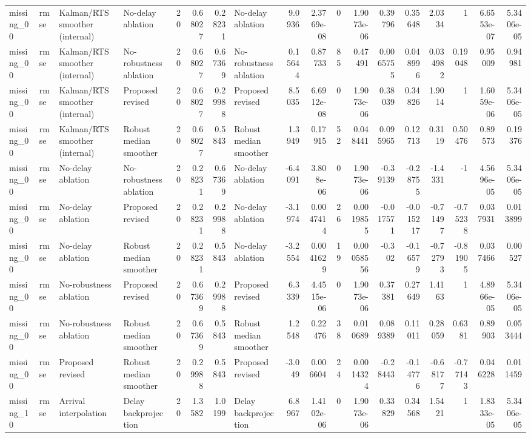 \begin{table}[!htbp]
{\begin{tabular}{llllrrrlrrrrrrrrrr}
missing_00 & rmse & Kalman/RTS smoother (internal) & No-delay ablation & 20 & 0.68027 & 0.28231 & No-delay ablation & 9.0936 & 2.3769e-08 & 0 & 1.9073e-06 & 0.39796 & 0.35648 & 2.0334 & 1 & 6.6553e-07 & 5.3406e-05 \\
missing_00 & rmse & Kalman/RTS smoother (internal) & No-robustness ablation & 20 & 0.68027 & 0.67369 & No-robustness ablation & 0.15644 & 0.87733 & 85 & 0.47491 & 0.0065755 & 0.048996 & 0.034982 & 0.19048 & 0.95009 & 0.94981 \\
missing_00 & rmse & Kalman/RTS smoother (internal) & Proposed revised & 20 & 0.68027 & 0.29988 & Proposed revised & 8.5035 & 6.6912e-08 & 0 & 1.9073e-06 & 0.38039 & 0.34826 & 1.9014 & 1 & 1.6059e-06 & 5.3406e-05 \\
missing_00 & rmse & Kalman/RTS smoother (internal) & Robust median smoother & 20 & 0.68027 & 0.5843 & Robust median smoother & 1.3949 & 0.17915 & 52 & 0.048441 & 0.095965 & 0.12713 & 0.3119 & 0.50476 & 0.89573 & 0.19376 \\
missing_00 & rmse & No-delay ablation & No-robustness ablation & 20 & 0.28231 & 0.67369 & No-delay ablation & -6.4091 & 3.808e-06 & 0 & 1.9073e-06 & -0.39139 & -0.28755 & -1.4331 & -1 & 4.5696e-05 & 5.3406e-05 \\
missing_00 & rmse & No-delay ablation & Proposed revised & 20 & 0.28231 & 0.29988 & No-delay ablation & -3.1974 & 0.0047414 & 26 & 0.0019855 & -0.017571 & -0.015217 & -0.71497 & -0.75238 & 0.037931 & 0.013899 \\
missing_00 & rmse & No-delay ablation & Robust median smoother & 20 & 0.28231 & 0.5843 & No-delay ablation & -3.2554 & 0.0041629 & 19 & 0.00058556 & -0.302 & -0.16579 & -0.72793 & -0.81905 & 0.037466 & 0.00527 \\
missing_00 & rmse & No-robustness ablation & Proposed revised & 20 & 0.67369 & 0.29988 & Proposed revised & 6.3339 & 4.4515e-06 & 0 & 1.9073e-06 & 0.37381 & 0.27649 & 1.4163 & 1 & 4.8966e-05 & 5.3406e-05 \\
missing_00 & rmse & No-robustness ablation & Robust median smoother & 20 & 0.67369 & 0.5843 & Robust median smoother & 1.2548 & 0.22476 & 38 & 0.010689 & 0.089389 & 0.11011 & 0.28059 & 0.6381 & 0.89903 & 0.053444 \\
missing_00 & rmse & Proposed revised & Robust median smoother & 20 & 0.29988 & 0.5843 & Proposed revised & -3.049 & 0.006604 & 24 & 0.0014324 & -0.28443 & -0.14776 & -0.68177 & -0.77143 & 0.046228 & 0.011459 \\
missing_10 & rmse & Arrival interpolation & Delay backprojection & 20 & 1.3582 & 1.0199 & Delay backprojection & 6.8967 & 1.4102e-06 & 0 & 1.9073e-06 & 0.33829 & 0.34568 & 1.5421 & 1 & 1.8333e-05 & 5.3406e-05 \\

\end{tabular}}
\end{table}
